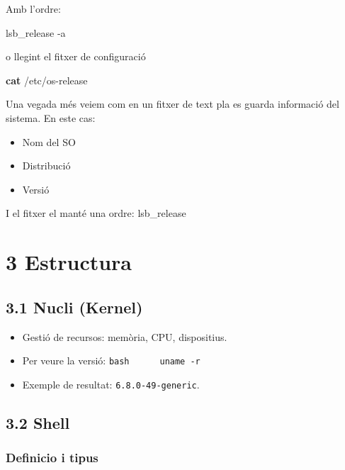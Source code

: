 \documentclass[
  a4paper,
]{article}
\newenvironment{Shaded}{\begin{snugshade}}{\end{snugshade}}
\newcommand{\AttributeTok}[1]{\textcolor[rgb]{0.13,0.29,0.53}{#1}}
\newcommand{\ExtensionTok}[1]{#1}
\newcommand{\FunctionTok}[1]{\textcolor[rgb]{0.13,0.29,0.53}{\textbf{#1}}}
\newcommand{\NormalTok}[1]{#1}
\providecommand{\tightlist}{%
  \setlength{\itemsep}{0pt}\setlength{\parskip}{0pt}}
\begin{document}
Amb l'ordre:

\begin{Shaded}
\begin{Highlighting}[]
\ExtensionTok{lsb\_release} \AttributeTok{{-}a}
\end{Highlighting}
\end{Shaded}

o llegint el fitxer de configuració

\begin{Shaded}
\begin{Highlighting}[]
\FunctionTok{cat}\NormalTok{ /etc/os{-}release}
\end{Highlighting}
\end{Shaded}

Una vegada més veiem com en un fitxer de text pla es guarda informació
del sistema. En este cas:

\begin{itemize}
\tightlist
\item
  Nom del SO
\item
  Distribució
\item
  Versió
\end{itemize}

I el fitxer el manté una ordre: lsb\_release

\section{3 Estructura}\label{estructura}

\subsection{3.1 Nucli (Kernel)}\label{nucli-kernel}

\begin{itemize}
\tightlist
\item
  Gestió de recursos: memòria, CPU, dispositius.
\item
  Per veure la versió: \texttt{bash\ \ \ \ \ \ uname\ -r}
\item
  Exemple de resultat: \texttt{6.8.0-49-generic}.
\end{itemize}

\subsection{3.2 Shell}\label{shell}

\subsubsection{Definicio i tipus}\label{definicio-i-tipus}
\end{document}
